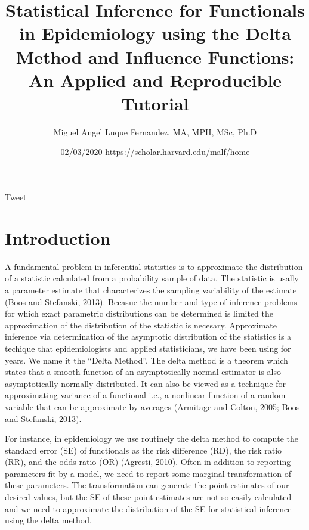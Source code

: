 \documentclass[]{article}
\title{Statistical Inference for Functionals in Epidemiology using the Delta
Method and Influence Functions: An Applied and Reproducible Tutorial}
\author{Miguel Angel Luque Fernandez, MA, MPH, MSc, Ph.D}
\date{02/03/2020 \url{https://scholar.harvard.edu/malf/home}}
\begin{document}
\maketitle

{
\setcounter{tocdepth}{2}
\tableofcontents
}
Tweet

\hypertarget{introduction}{%
\section{Introduction}\label{introduction}}

A fundamental problem in inferential statistics is to approximate the
distribution of a statistic calculated from a probability sample of
data. The statistic is usally a parameter estimate that characterizes
the sampling variability of the estimate (Boos and Stefanski, 2013).
Becasue the number and type of inference problems for which exact
parametric distributions can be determined is limited the approximation
of the distribution of the statistic is necesary. Approximate inference
via determination of the asymptotic distribution of the statistics is a
techique that epidemiologists and applied statisticians, we have been
using for years. We name it the ``Delta Method''. The delta method is a
theorem which states that a smooth function of an asymptotically normal
estimator is also asymptotically normally distributed. It can also be
viewed as a technique for approximating variance of a functional i.e., a
nonlinear function of a random variable that can be approximate by
averages (Armitage and Colton, 2005; Boos and Stefanski, 2013).

For instance, in epidemiology we use routinely the delta method to
compute the standard error (SE) of functionals as the risk difference
(RD), the risk ratio (RR), and the odds ratio (OR) (Agresti, 2010).
Often in addition to reporting parameters fit by a model, we need to
report some marginal transformation of these parameters. The
transformation can generate the point estimates of our desired values,
but the SE of these point estimates are not so easily calculated and we
need to approximate the distribution of the SE for statistical inference
using the delta method.
\end{document}
